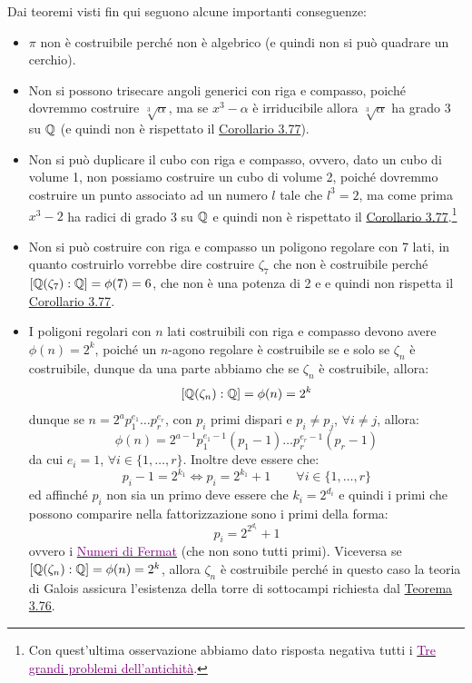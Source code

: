 \documentclass[11pt]{scrartcl}
\begin{document}
\begin{remark}
    Dai teoremi visti fin qui seguono alcune importanti conseguenze:
    \begin{itemize}
        \item $\pi$ non è costruibile perché non è algebrico (e quindi non si può quadrare un cerchio).
        \item Non si possono trisecare angoli generici con riga e compasso, poiché dovremmo costruire $\sqrt[3]{\alpha}$, ma se $x^3 - \alpha$ è irriducibile
        allora $\sqrt[3]{\alpha}$ ha grado 3 su $\mathbb Q$ (e quindi non è rispettato il \hyperref[3.77]{Corollario 3.77}).
        \item Non si può duplicare il cubo con riga e compasso, ovvero, dato un cubo di volume 1, non possiamo costruire un cubo di volume 2, poiché dovremmo
        costruire un punto associato ad un numero $l$ tale che $l^3 = 2$, ma come prima $x^3-2$ ha radici di grado 3 su $\mathbb Q$ e quindi non è rispettato il \hyperref[3.77]{Corollario 3.77}.\footnote{Con
        quest'ultima osservazione abbiamo dato risposta negativa tutti i \href{https://it.wikipedia.org/wiki/Tre_grandi_problemi_dell\%27antichit\%C3\%A0}{\textcolor{purple}{Tre grandi problemi dell'antichità}}.}
        \item Non si può costruire con riga e compasso un poligono regolare con 7 lati, in quanto costruirlo vorrebbe dire costruire $\zeta_7$ che non è costruibile perché $[\mathbb Q(\zeta_7) : \mathbb Q] = \phi(7) = 6$,
        che non è una potenza di 2 e e quindi non rispetta il \hyperref[3.77]{Corollario 3.77}.
        \item I poligoni regolari con $n$ lati costruibili con riga e compasso devono avere $\phi(n) = 2^k$, poiché un $n$-agono regolare è costruibile se e solo se $\zeta_n$ è costruibile, dunque da una parte abbiamo che se $\zeta_n$ è costruibile, allora:
        \[ [\mathbb Q(\zeta_n) : \mathbb Q] = \phi(n) = 2^k
            \]
        dunque se $n = 2^a p_1^{e_1}\ldots p_r^{e_r}$, con $p_i$ primi dispari e $p_i \ne p_j$, $\forall i \ne j$, allora:
        \[ \phi(n) = 2^{a-1}p_1^{e_1-1}(p_1 - 1)\ldots p_r^{e_r-1}(p_r - 1)
            \]
        da cui $e_i = 1$, $\forall i \in \{1,\ldots,r\}$. Inoltre deve essere che:
        \[ p_i - 1 = 2^{k_1} \iff p_i = 2^{k_1} + 1 \qquad \forall i \in \{1,\ldots,r\}
            \]
        ed affinché $p_i$ non sia un primo deve essere che $k_i = 2^{d_i}$ e quindi i primi che possono comparire nella fattorizzazione sono i primi della forma:
        \[ p_i = 2^{2^{d_i}} + 1
            \]
        ovvero i \href{https://it.wikipedia.org/wiki/Numero_di_Fermat}{\textcolor{purple}{Numeri di Fermat}} (che non sono tutti primi). Viceversa se $[\mathbb Q(\zeta_n) : \mathbb Q] = \phi(n) = 2^k$, allora $\zeta_n$ è costruibile perché in questo caso 
        la teoria di Galois assicura l'esistenza della torre di sottocampi richiesta dal \hyperref[3.76]{Teorema 3.76}.
    \end{itemize}
\end{remark}
\end{document}
